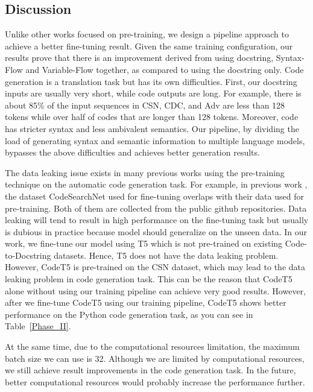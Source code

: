 \documentclass[11pt]{article}
\begin{document}
\subsection{Discussion}





Unlike other works focused on pre-training, we design a pipeline approach to achieve a better fine-tuning result. Given the same training configuration, our results prove that there is an improvement derived from using docstring, Syntax-Flow and Variable-Flow together, as compared to using the docstring only. Code generation is a translation task but has its own difficulties. First, our docstring inputs are usually very short, while code outputs are long. For example, there is about 85\% of the input sequences in CSN, CDC, and Adv are less than 128 tokens while over half of codes that are longer than 128 tokens. Moreover, code has stricter syntax and less ambivalent semantics. Our pipeline, by dividing the load of generating syntax and semantic information to multiple language models, bypasses the above difficulties and achieves better generation results.

The data leaking issue exists in many previous works using the pre-training technique on the automatic code generation task. For example, in previous work \citep{Clement2020PyMT5MT}, the dataset CodeSearchNet used for fine-tuning overlaps with their data used for pre-training. Both of them are collected from the public github repositories. Data leaking will tend to result in high performance on the fine-tuning task but usually is dubious in practice because model should generalize on the unseen data. In our work, we fine-tune our model using T5 which is not pre-trained on existing Code-to-Docstring datasets. Hence, T5 does not have the data leaking problem. However, CodeT5 is pre-trained on the CSN dataset, which may lead to the data leaking problem in code generation task. This can be the reason that CodeT5 alone without using our training pipeline can achieve very good results. However, after we fine-tune CodeT5 using our training pipeline, CodeT5 shows better performance on the Python code generation task, as you can see in Table~\ref{Phase_II}. 



At the same time, due to the computational resources limitation, the maximum batch size we can use is 32. Although we are limited by computational resources, we still achieve result improvements in the code generation task. In the future, better computational resources would probably increase the performance further.
\end{document}
